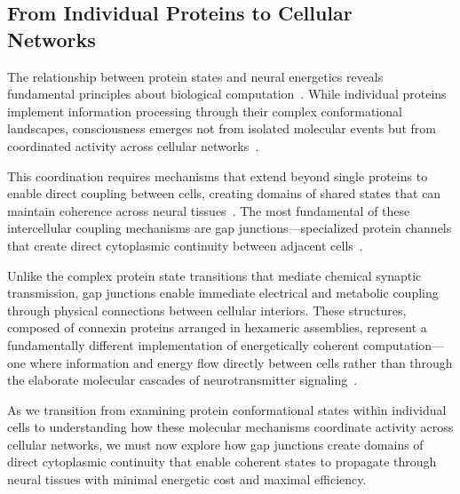 \subsection*{From Individual Proteins to Cellular Networks~}

The relationship between protein states and neural energetics reveals fundamental principles about biological computation~\cite{Karplus2005, Zhou2008}. While individual proteins implement information processing through their complex conformational landscapes, consciousness emerges not from isolated molecular events but from coordinated activity across cellular networks~\cite{Hameroff2014, breakspear2005dynamics}.

This coordination requires mechanisms that extend beyond single proteins to enable direct coupling between cells, creating domains of shared states that can maintain coherence across neural tissues~\cite{Bennett2004, Sudhof2018}. The most fundamental of these intercellular coupling mechanisms are gap junctions—specialized protein channels that create direct cytoplasmic continuity between adjacent cells~\cite{Nagy2018, Giaume2010}.

Unlike the complex protein state transitions that mediate chemical synaptic transmission, gap junctions enable immediate electrical and metabolic coupling through physical connections between cellular interiors. These structures, composed of connexin proteins arranged in hexameric assemblies, represent a fundamentally different implementation of energetically coherent computation—one where information and energy flow directly between cells rather than through the elaborate molecular cascades of neurotransmitter signaling~\cite{Willecke2002, Pereda2014}.

As we transition from examining protein conformational states within individual cells to understanding how these molecular mechanisms coordinate activity across cellular networks, we must now explore how gap junctions create domains of direct cytoplasmic continuity that enable coherent states to propagate through neural tissues with minimal energetic cost and maximal efficiency.
